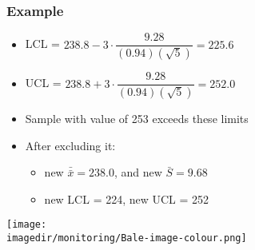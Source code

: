 \begin{frame}\frametitle{Example}
	\begin{itemize}
		\item	LCL = $238.8 - 3 \cdot \dfrac{9.28}{(0.94)(\sqrt{5})} = 225.6$
		\item	UCL = $238.8 + 3 \cdot \dfrac{9.28}{(0.94)(\sqrt{5})} = 252.0$
		\item	Sample with value of 253 exceeds these limits
		\item	After excluding it:
		\begin{itemize}
			\item	new $\bar{\bar{x}} = 238.0$, and new $\bar{S} = 9.68$
			\item	new LCL = 224, new UCL = 252
		\end{itemize}
	\end{itemize}
	\begin{center}
		\texttt{[image: \\imagedir/monitoring/Bale-image-colour.png]}
	\end{center}
\end{frame}

